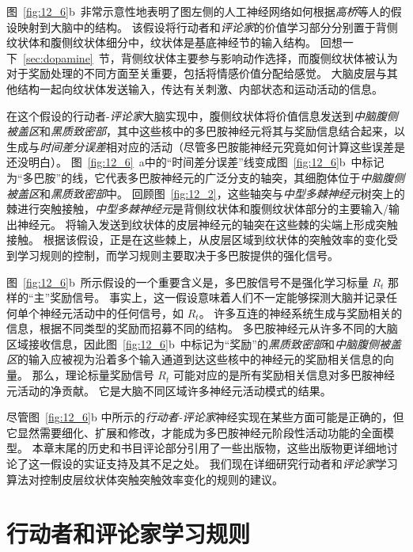 图~\ref{fig:12_6}b~非常示意性地表明了图左侧的人工神经网络如何根据\textit{高桥}等人的假设映射到大脑中的结构\cite{takahashi2008silencing}。
该假设将行动者和\textit{评论家}的价值学习部分分别置于背侧纹状体和腹侧纹状体细分中，纹状体是基底神经节的输入结构。
回想一下~\ref{sec:dopamine}~节，背侧纹状体主要参与影响动作选择，而腹侧纹状体被认为对于奖励处理的不同方面至关重要，包括将情感价值分配给感觉。
大脑皮层与其他结构一起向纹状体发送输入，传达有关刺激、内部状态和运动活动的信息。


在这个假设的行动者-\textit{评论家}大脑实现中，腹侧纹状体将价值信息发送到\textit{中脑腹侧被盖区}和\textit{黑质致密部}，其中这些核中的多巴胺神经元将其与奖励信息结合起来，以生成与\textit{时间差分误差}相对应的活动（尽管多巴胺能神经元究竟如何计算这些误差是还没明白）。
图~\ref{fig:12_6}~a中的“时间差分误差”线变成图~\ref{fig:12_6}b~中标记为“多巴胺”的线，它代表多巴胺神经元的广泛分支的轴突，其细胞体位于\textit{中脑腹侧被盖区}和\textit{黑质致密部}中。
回顾图~\ref{fig:12_2}，这些轴突与\textit{中型多棘神经元}树突上的棘进行突触接触，\textit{中型多棘神经元}是背侧纹状体和腹侧纹状体部分的主要输入/输出神经元。
将输入发送到纹状体的皮层神经元的轴突在这些棘的尖端上形成突触接触。
根据该假设，正是在这些棘上，从皮层区域到纹状体的突触效率的变化受到学习规则的控制，而学习规则主要取决于多巴胺提供的强化信号。


图~\ref{fig:12_6}b~所示假设的一个重要含义是，多巴胺信号不是强化学习标量 $R_t$ 那样的“主”奖励信号。
事实上，这一假设意味着人们不一定能够探测大脑并记录任何单个神经元活动中的任何信号，如 $R_t$。
许多互连的神经系统生成与奖励相关的信息，根据不同类型的奖励而招募不同的结构。
多巴胺神经元从许多不同的大脑区域接收信息，因此图~\ref{fig:12_6}b~中标记为“奖励”的\textit{黑质致密部}和\textit{中脑腹侧被盖区}的输入应被视为沿着多个输入通道到达这些核中的神经元的奖励相关信息的向量。
那么，理论标量奖励信号 $R_t$ 可能对应的是所有奖励相关信息对多巴胺神经元活动的净贡献。
它是大脑不同区域许多神经元活动模式的结果。


尽管图~\ref{fig:12_6}b 中所示的\textit{行动者-评论家}神经实现在某些方面可能是正确的，但它显然需要细化、扩展和修改，才能成为多巴胺神经元阶段性活动功能的全面模型。
本章末尾的历史和书目评论部分引用了一些出版物，这些出版物更详细地讨论了这一假设的实证支持及其不足之处。
我们现在详细研究行动者和\textit{评论家}学习算法对控制皮层纹状体突触突触效率变化的规则的建议。





\section{行动者和评论家学习规则} \label{sec:ac_rules}

